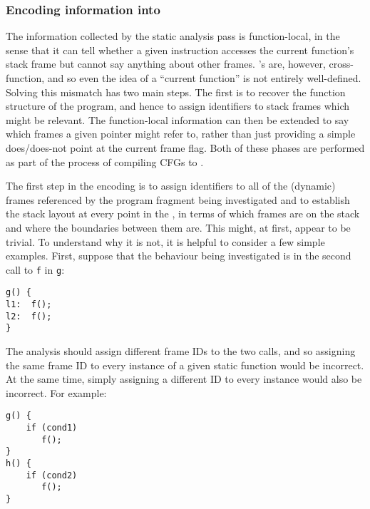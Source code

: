 \subsubsection{Encoding information into \StateMachines}

The information collected by the static analysis pass is
function-local, in the sense that it can tell whether a given
instruction accesses the current function's stack frame but cannot say
anything about other frames.  {\Technique}'s {\StateMachines} are,
however, cross-function, and so even the idea of a ``current
function'' is not entirely well-defined.  Solving this mismatch has
two main steps.  The first is to recover the function structure of the
program, and hence to assign identifiers to stack frames which might
be relevant.  The function-local information can then be extended to
say which frames a given pointer might refer to, rather than just
providing a simple does/does-not point at the current frame flag.
Both of these phases are performed as part of the process of compiling
CFGs to {\StateMachines}.


The first step in the encoding is to assign identifiers to all of the
(dynamic) frames referenced by the program fragment being investigated
and to establish the stack layout at every point in the
{\StateMachine}, in terms of which frames are on the stack and where
the boundaries between them are.  This might, at first, appear to be
trivial.  To understand why it is not, it is helpful to consider a few
simple examples.  First, suppose that the behaviour being investigated
is in the second call to \verb|f| in \verb|g|:

\begin{verbatim}
g() {
l1:  f();
l2:  f();
}
\end{verbatim}

The analysis should assign different frame IDs to the two calls, and
so assigning the same frame ID to every instance of a given static
function would be incorrect.  At the same time, simply assigning a
different ID to every instance would also be incorrect.  For example:

\begin{verbatim}
g() {
    if (cond1)
       f();
}
h() {
    if (cond2)
       f();
}
\end{verbatim}

